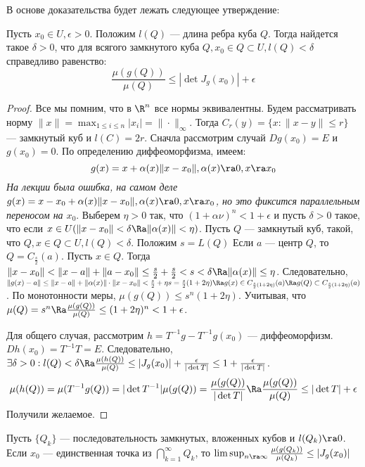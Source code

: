 В основе доказательства будет лежать следующее утверждение:
\begin{lemma}
    Пусть \(x_0 \in U, \epsilon > 0\). Положим \(l(Q)\) --- длина ребра куба \(Q\). Тогда найдется такое \(\delta > 0\), что для всягого замкнутого куба \(Q, x_0 \in Q \subset U, l(Q) < \delta\) справедливо равенство:
    \[\frac{\mu(g(Q))}{\mu(Q)} \le |\det J_g(x_0)| + \epsilon\]
\end{lemma}
\begin{proof}
    Все мы помним, что в \(\R^n\) все нормы эквивалентны. Будем рассматривать норму \(\|x\| = \max_{1 \le i \le n}|x_i| =\|\cdot\|_{\infty}\). Тогда \(C_r(y) = \{x: \|x - y\| \le r\}\) --- замкнутый куб и \(l(C) = 2r\). Сначла рассмотрим случай \(Dg(x_0) = E\) и \(g(x_0) = 0\). По определению диффеоморфизма, имеем:
    \[g(x) = x + \alpha(x) \|x - x_0\|, \alpha(x) \ra 0, x \ra x_0\]
    \textit{На лекции была ошибка, на самом деле \(g(x) = x - x_0 + \alpha(x) \|x - x_0\|, \alpha(x) \ra 0, x \ra x_0\), но это фиксится параллельным переносом на \(x_0\)}.
    Выберем \(\eta > 0\) так, что \((1 + \alpha \nu)^n < 1 + \epsilon\) и пусть \(\delta > 0\) такое, что если \(x \in U (\|x - x_0\| < \delta \Ra \|\alpha(x)\| < \eta)\). Пусть \(Q\) --- замкнутый куб, такой, что \(Q, x \in Q \subset U, l(Q) < \delta\). Положим \(s = L(Q)\) Если \(a\) --- центр \(Q\), то \(Q = C_{\frac{s}{2}}(a)\). Пусть \(x \in Q\). Тогда \(\|x - x_0\| < \|x - a\| + \|a - x_0\| \le \frac{s}{2} + \frac{s}{2} < s < \delta \Ra \|\alpha(x)\| \le \eta\). Следовательно, \(\|g(x) - a\| \le \|x - a\| + \|\alpha(x)\|\cdot\|x-x_0\| < \frac{s}{2} + \eta s = \frac{s}{2}(1 + 2\eta) \Ra g(x) \in C_{\frac{s}{2}(1 + 2\eta)}(a) \Ra g(Q) \subset C_{\frac{s}{2}(1 + 2\eta)}(a)\). По монотонности меры, \(\mu(g(Q)) \le s^n(1 + 2\eta)\). Учитывая, что \(\mu(Q) = s^n \Ra \frac{\mu(g(Q))}{\mu(Q)} \le (1 + 2\eta)^n < 1 + \epsilon\).

    Для общего случая, рассмотрим \(h = T^{-1} g - T^{-1} g(x_0)\) --- диффеоморфизм. \(Dh(x_0) = T^{-1}T = E\). Следовательно, \(\exists \delta > 0: l(Q) < \delta \Ra \frac{\mu(h(Q))}{\mu(Q)} \le |J_g(x_0)| + \frac{\epsilon}{|\det T|} \le 1 + \frac{\epsilon}{|\det T|}\).
    \[\mu(h(Q)) = \mu(T^{-1}g(Q)) = |\det T^{-1}|\mu(g(Q)) = \frac{\mu(g(Q))}{|\det T|} \Ra \frac{\mu(g(Q))}{\mu(Q)} \le |\det T| + \epsilon\]
    Получили желаемое.
\end{proof}

\begin{corollary}
    Пусть \(\{Q_k\}\) --- последовательность замкнутых, вложенных кубов и \(l(Q_k) \ra 0\). Если \(x_0\) --- единственная точка из \(\bigcap_{k = 1}^\infty Q_k\), то \(\limsup_{n \ra \infty} \frac{\mu(g(Q_k))}{\mu(Q_k)} \le |J_g(x_0)|\)
\end{corollary}

